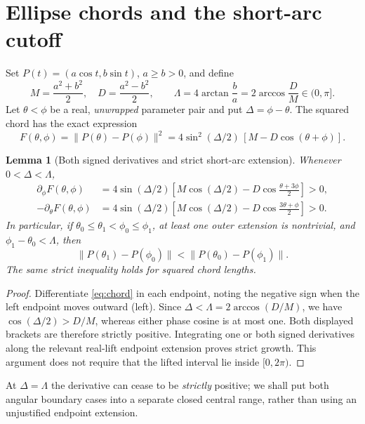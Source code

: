 \documentclass[11pt,a4paper]{article}
\newtheorem{lemma}[theorem]{Lemma}
\theoremstyle{definition}\newtheorem{definition}[theorem]{Definition}
\theoremstyle{remark}\newtheorem{remark}[theorem]{Remark}
\newcommand{\dist}[2]{\lVert #1-#2\rVert}
\begin{document}
\section{Ellipse chords and the short-arc cutoff}\label{sec:derivative}
Set $P(t)=(a\cos t,b\sin t)$, $a\ge b>0$, and define
\begin{equation}\label{eq:lambda}
 M=\frac{a^2+b^2}{2},\quad D=\frac{a^2-b^2}{2},\qquad
 \Lambda=4\arctan\frac ba=2\arccos\frac DM\in(0,\pi].
\end{equation}
Let $\theta<\phi$ be a real, \emph{unwrapped} parameter pair and put $\Delta=\phi-\theta$. The squared chord has the exact expression
\begin{equation}\label{eq:chord}
 F(\theta,\phi)=\dist{P(\theta)}{P(\phi)}^2
 =4\sin^2(\Delta/2)\,[M-D\cos(\theta+\phi)].
\end{equation}

\begin{lemma}[Both signed derivatives and strict short-arc extension]\label{lem:short}
Whenever $0<\Delta<\Lambda$,
\begin{align}
 \partial_\phi F(\theta,\phi)
 &=4\sin(\Delta/2)\left[M\cos(\Delta/2)-D\cos\frac{\theta+3\phi}{2}\right]>0,\label{eq:right}\\[1mm]
 -\partial_\theta F(\theta,\phi)
 &=4\sin(\Delta/2)\left[M\cos(\Delta/2)-D\cos\frac{3\theta+\phi}{2}\right]>0.\label{eq:left}
\end{align}
In particular, if $\theta_0\le\theta_1<\phi_0\le\phi_1$, at least one outer extension is nontrivial, and $\phi_1-\theta_0<\Lambda$, then
\[
 \dist{P(\theta_1)}{P(\phi_0)}
 <\dist{P(\theta_0)}{P(\phi_1)}.
\]
The same strict inequality holds for squared chord lengths.
\end{lemma}
\begin{proof}
Differentiate \eqref{eq:chord} in each endpoint, noting the negative sign when the left endpoint moves outward (left). Since $\Delta<\Lambda=2\arccos(D/M)$, we have $\cos(\Delta/2)>D/M$, whereas either phase cosine is at most one. Both displayed brackets are therefore strictly positive. Integrating one or both signed derivatives along the relevant real-lift endpoint extension proves strict growth. This argument does not require that the lifted interval lie inside $[0,2\pi)$.
\end{proof}

At $\Delta=\Lambda$ the derivative can cease to be \emph{strictly} positive; we shall put both angular boundary cases into a separate closed central range, rather than using an unjustified endpoint extension.
\end{document}

